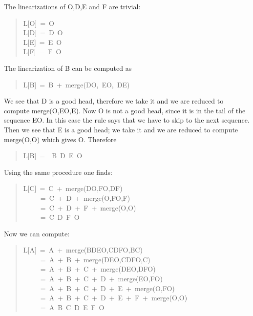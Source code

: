 \documentclass[10pt,english]{article}
\begin{document}
The linearizations of O,D,E and F are trivial:
\begin{quote}
\begin{ttfamily}\begin{flushleft}
\mbox{L[O]~=~O}\\
\mbox{L[D]~=~D~O}\\
\mbox{L[E]~=~E~O}\\
\mbox{L[F]~=~F~O}
\end{flushleft}\end{ttfamily}
\end{quote}

The linearization of B can be computed as
\begin{quote}
\begin{ttfamily}\begin{flushleft}
\mbox{L[B]~=~B~+~merge(DO,~EO,~DE)}
\end{flushleft}\end{ttfamily}
\end{quote}

We see that D is a good head, therefore we take it and we are reduced to
compute merge(O,EO,E).  Now O is not a good head, since it is in the
tail of the sequence EO.  In this case the rule says that we have to
skip to the next sequence.  Then we see that E is a good head; we take
it and we are reduced to compute merge(O,O) which gives O. Therefore
\begin{quote}
\begin{ttfamily}\begin{flushleft}
\mbox{L[B]~=~~B~D~E~O}
\end{flushleft}\end{ttfamily}
\end{quote}

Using the same procedure one finds:
\begin{quote}
\begin{ttfamily}\begin{flushleft}
\mbox{L[C]~=~C~+~merge(DO,FO,DF)}\\
\mbox{~~~~~=~C~+~D~+~merge(O,FO,F)}\\
\mbox{~~~~~=~C~+~D~+~F~+~merge(O,O)}\\
\mbox{~~~~~=~C~D~F~O}
\end{flushleft}\end{ttfamily}
\end{quote}

Now we can compute:
\begin{quote}
\begin{ttfamily}\begin{flushleft}
\mbox{L[A]~=~A~+~merge(BDEO,CDFO,BC)}\\
\mbox{~~~~~=~A~+~B~+~merge(DEO,CDFO,C)}\\
\mbox{~~~~~=~A~+~B~+~C~+~merge(DEO,DFO)}\\
\mbox{~~~~~=~A~+~B~+~C~+~D~+~merge(EO,FO)}\\
\mbox{~~~~~=~A~+~B~+~C~+~D~+~E~+~merge(O,FO)}\\
\mbox{~~~~~=~A~+~B~+~C~+~D~+~E~+~F~+~merge(O,O)}\\
\mbox{~~~~~=~A~B~C~D~E~F~O}
\end{flushleft}\end{ttfamily}
\end{quote}
\end{document}
